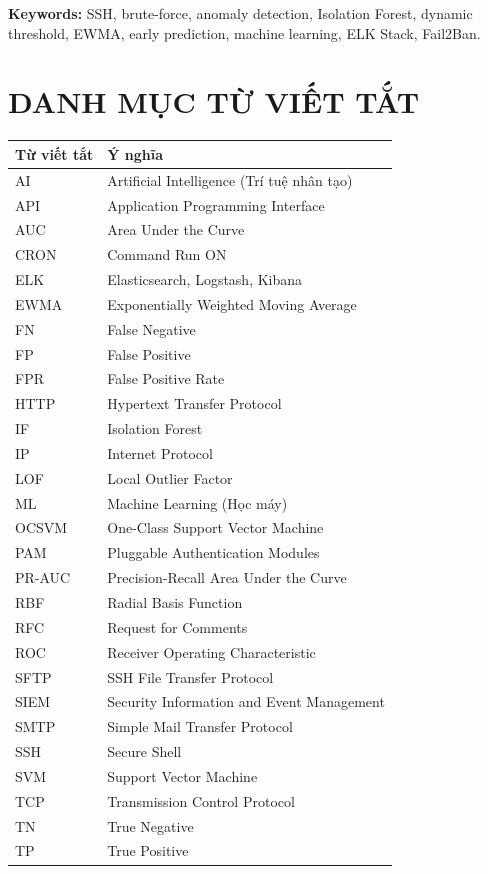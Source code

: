 \documentclass[13pt,a4paper,oneside]{report}
\begin{document}
\vspace{0.5cm}
\noindent\textbf{Keywords:} SSH, brute-force, anomaly detection, Isolation Forest, dynamic threshold, EWMA, early prediction, machine learning, ELK Stack, Fail2Ban.

\tableofcontents

\listoffigures
{}

\listoftables
{}

\chapter*{DANH MỤC TỪ VIẾT TẮT}

\begin{longtable}{lp{10cm}}
\toprule
\textbf{Từ viết tắt} & \textbf{Ý nghĩa} \\
\midrule
AI & Artificial Intelligence (Trí tuệ nhân tạo) \\
API & Application Programming Interface \\
AUC & Area Under the Curve \\
CRON & Command Run ON \\
ELK & Elasticsearch, Logstash, Kibana \\
EWMA & Exponentially Weighted Moving Average \\
FN & False Negative \\
FP & False Positive \\
FPR & False Positive Rate \\
HTTP & Hypertext Transfer Protocol \\
IF & Isolation Forest \\
IP & Internet Protocol \\
LOF & Local Outlier Factor \\
ML & Machine Learning (Học máy) \\
OCSVM & One-Class Support Vector Machine \\
PAM & Pluggable Authentication Modules \\
PR-AUC & Precision-Recall Area Under the Curve \\
RBF & Radial Basis Function \\
RFC & Request for Comments \\
ROC & Receiver Operating Characteristic \\
SFTP & SSH File Transfer Protocol \\
SIEM & Security Information and Event Management \\
SMTP & Simple Mail Transfer Protocol \\
SSH & Secure Shell \\
SVM & Support Vector Machine \\
TCP & Transmission Control Protocol \\
TN & True Negative \\
TP & True Positive \\
\bottomrule
\end{longtable}
\end{document}
